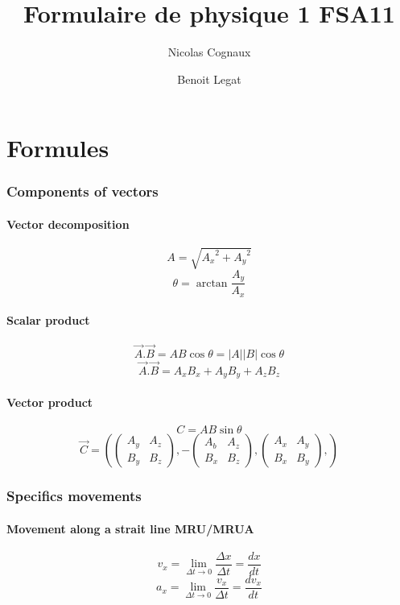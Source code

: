 \documentclass[a4paper,10pt]{article}
\title{Formulaire de physique 1 FSA11}
\author{Nicolas Cognaux \and Benoit Legat}
\begin{document}
\maketitle

\newpage
\part{Formules}

\section{Components of vectors}
\subsection{Vector decomposition}
\[ A = \sqrt{{A_x}^2 + {A_y}^2} \]
\[ \theta = \arctan{\frac{A_y}{A_x}} \]

\subsection{Scalar product}
\[ \vec{A}.\vec{B} = AB\cos{\theta} = |A||B|\cos{\theta} \]
\[ \vec{A}.\vec{B} = A_x B_x + A_y B_y + A_z B_z \]

\subsection{Vector product}
\[ C = AB\sin{\theta} \]
\[ \vec{C} = \left( \begin{pmatrix}
	  A_y&A_z \\
	  B_y&B_z
          \end{pmatrix}, - \begin{pmatrix}
	  A_b&A_z \\
	  B_x&B_z
          \end{pmatrix}, \begin{pmatrix}
	  A_x&A_y \\
	  B_x&B_y
          \end{pmatrix},\right)
\]

\section{Specifics movements}
\subsection{Movement along a strait line MRU/MRUA}
\[ v_x = \displaystyle {\lim_{\Delta t \rightarrow 0 }} \frac{\Delta x}{\Delta t} = \frac{dx}{dt} \]
\[ a_x = \displaystyle {\lim_{\Delta t \rightarrow 0 }} \frac{v_x}{\Delta t} = \frac{dv_x}{dt} \]
\end{document}
